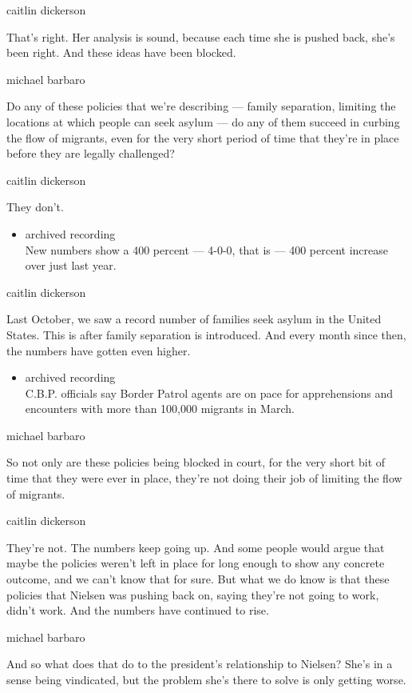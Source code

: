 caitlin dickerson

That's right. Her analysis is sound, because each time she is pushed
back, she's been right. And these ideas have been blocked.

michael barbaro

Do any of these policies that we're describing --- family separation,
limiting the locations at which people can seek asylum --- do any of
them succeed in curbing the flow of migrants, even for the very short
period of time that they're in place before they are legally challenged?

caitlin dickerson

They don't.

\begin{itemize}
\tightlist
\item
  archived recording\\
  New numbers show a 400 percent --- 4-0-0, that is --- 400 percent
  increase over just last year.
\end{itemize}

caitlin dickerson

Last October, we saw a record number of families seek asylum in the
United States. This is after family separation is introduced. And every
month since then, the numbers have gotten even higher.

\begin{itemize}
\tightlist
\item
  archived recording\\
  C.B.P. officials say Border Patrol agents are on pace for
  apprehensions and encounters with more than 100,000 migrants in March.
\end{itemize}

michael barbaro

So not only are these policies being blocked in court, for the very
short bit of time that they were ever in place, they're not doing their
job of limiting the flow of migrants.

caitlin dickerson

They're not. The numbers keep going up. And some people would argue that
maybe the policies weren't left in place for long enough to show any
concrete outcome, and we can't know that for sure. But what we do know
is that these policies that Nielsen was pushing back on, saying they're
not going to work, didn't work. And the numbers have continued to rise.

michael barbaro

And so what does that do to the president's relationship to Nielsen?
She's in a sense being vindicated, but the problem she's there to solve
is only getting worse.

